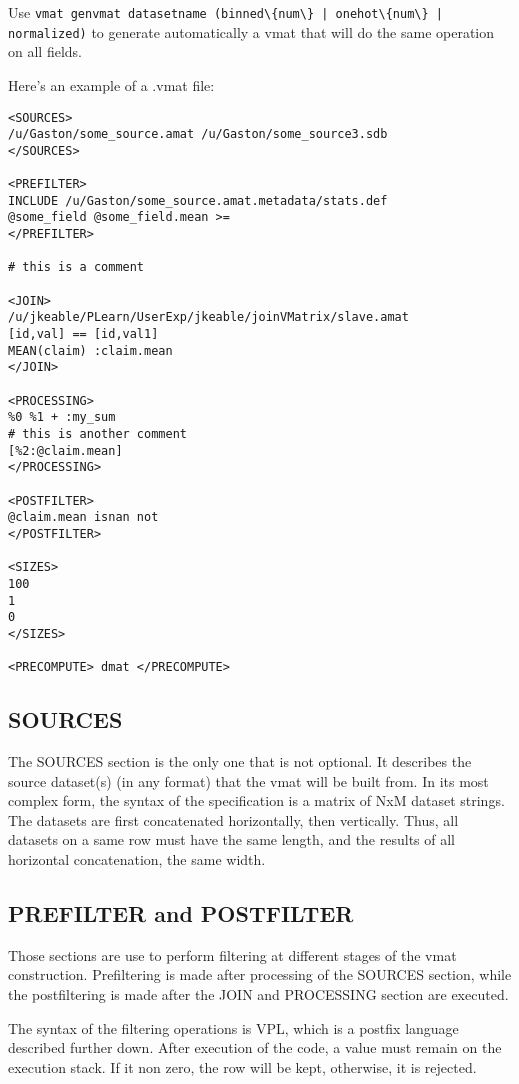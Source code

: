 \documentclass[11pt]{book}
\begin{document}
Use \verb!vmat genvmat datasetname (binned\{num\} | onehot\{num\} | normalized)! to generate automatically a vmat that will do the same operation on all fields.

Here's an example of a .vmat file:
\begin{verbatim}
<SOURCES>
/u/Gaston/some_source.amat /u/Gaston/some_source3.sdb
</SOURCES>

<PREFILTER>
INCLUDE /u/Gaston/some_source.amat.metadata/stats.def
@some_field @some_field.mean >=
</PREFILTER>

# this is a comment

<JOIN>
/u/jkeable/PLearn/UserExp/jkeable/joinVMatrix/slave.amat
[id,val] == [id,val1]
MEAN(claim) :claim.mean
</JOIN>

<PROCESSING>
%0 %1 + :my_sum
# this is another comment
[%2:@claim.mean]
</PROCESSING>

<POSTFILTER>
@claim.mean isnan not
</POSTFILTER>

<SIZES>
100
1
0
</SIZES>

<PRECOMPUTE> dmat </PRECOMPUTE>
\end{verbatim}


\subsection{SOURCES}
The SOURCES section is the only one that is not optional. It describes the source dataset(s) (in any format) that the vmat will be built from. In its most complex form, the syntax of the specification is a matrix of NxM dataset strings. The datasets are first concatenated horizontally, then vertically. Thus, all datasets on a same row must have the same length, and the results of all horizontal concatenation, the same width.

\subsection{PREFILTER and POSTFILTER}

Those sections are use to perform filtering at different stages of the vmat construction. Prefiltering is made after processing of the SOURCES section, while the postfiltering is made after the JOIN and PROCESSING section are executed. 

The syntax of the filtering operations is VPL, which is a postfix language described further down. After execution of the code, a value must remain on the execution stack. If it non zero, the row will be kept, otherwise, it is rejected.
\end{document}

